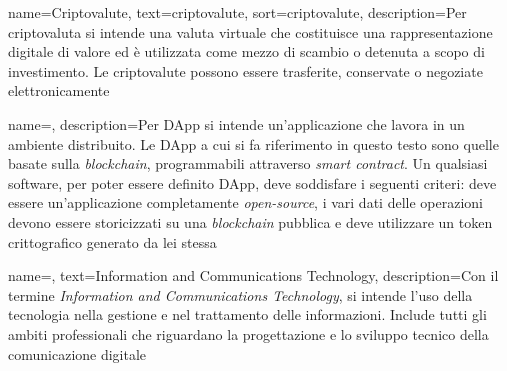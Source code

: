 
\renewcommand{\acronymname}{Acronimi e Abbreviazioni}

    



\renewcommand{\glossaryname}{Glossario}

{
    name={Criptovalute},
    text={criptovalute},
    sort={criptovalute},
    description={Per criptovaluta si intende una valuta virtuale che costituisce una rappresentazione digitale di valore ed è utilizzata come mezzo di scambio o detenuta a scopo di investimento. Le criptovalute possono essere trasferite, conservate o negoziate elettronicamente}
}

{
    name={},
    description={Per DApp si intende un'applicazione che lavora in un ambiente distribuito. Le DApp a cui si fa riferimento in questo testo sono quelle basate sulla \textit{blockchain}, programmabili attraverso \textit{smart contract}. Un qualsiasi software, per poter essere definito DApp, deve soddisfare i seguenti criteri: deve essere un'applicazione completamente \textit{open-source}, i vari dati delle operazioni devono essere storicizzati su una \textit{blockchain} pubblica e deve utilizzare un token crittografico generato da lei stessa}
}

{
    name=,
    text=Information and Communications Technology,
    description={Con il termine \textit{Information and Communications Technology}, si intende l'uso della tecnologia nella gestione e nel trattamento delle informazioni. Include tutti gli ambiti professionali che riguardano la progettazione e lo sviluppo tecnico della comunicazione digitale}
}

